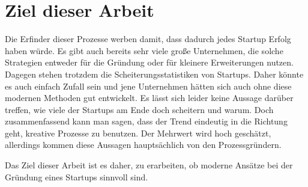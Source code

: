 \section{Ziel dieser Arbeit}
Die Erfinder dieser Prozesse werben damit, dass dadurch jedes Startup Erfolg haben würde. Es gibt auch bereits sehr viele große Unternehmen, die solche Strategien entweder für die Gründung oder für kleinere Erweiterungen nutzen. Dagegen stehen trotzdem die Scheiterungsstatistiken von Startups. Daher könnte es auch einfach Zufall sein und jene Unternehmen hätten sich auch ohne diese modernen Methoden gut entwickelt. Es lässt sich leider keine Aussage darüber treffen, wie viele der Startups am Ende doch scheitern und warum. Doch zusammenfassend kann man sagen, dass der Trend eindeutig in die Richtung geht, kreative Prozesse zu benutzen. Der Mehrwert wird hoch geschätzt, allerdings kommen diese Aussagen hauptsächlich von den Prozessgründern.

Das Ziel dieser Arbeit ist es daher, zu erarbeiten, ob moderne Ansätze bei der Gründung eines Startups sinnvoll sind. 